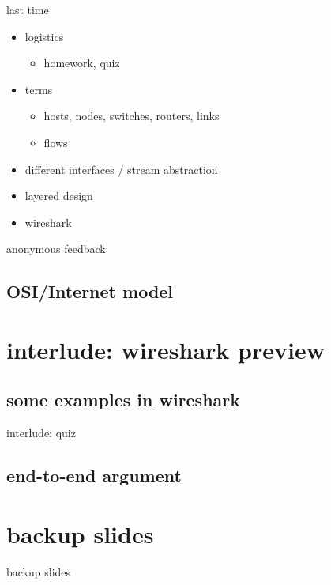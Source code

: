 \date{}
\title{}
\date{}
\usepackage{pgfplots}
\pgfplotsset{compat=1.16}

\begin{frame}
    \titlepage
\end{frame}



\begin{frame}{last time}
    \begin{itemize}
    \item logistics
        \begin{itemize}
        \item homework, quiz
        \end{itemize}
    \item terms
        \begin{itemize}
        \item hosts, nodes, switches, routers, links
        \item flows
        \end{itemize}
    \item different interfaces / stream abstraction
    \item layered design
    \item wireshark
    \end{itemize}
\end{frame}

\begin{frame}{anonymous feedback}
\end{frame}

\subsection{OSI/Internet model}




\section{interlude: wireshark preview}



\subsection{some examples in wireshark}


\begin{frame}{interlude: quiz}
\end{frame}

\subsection{end-to-end argument}






\section{backup slides}
\begin{frame}{backup slides}
\end{frame}



